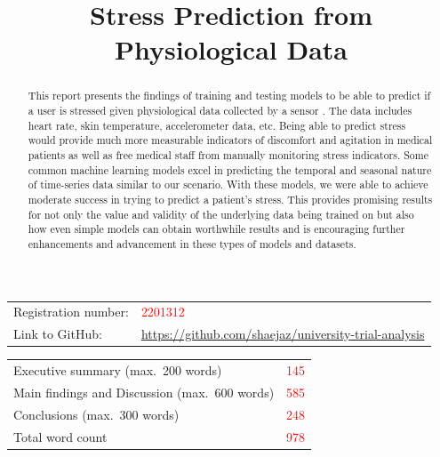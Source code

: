 \documentclass{article}
\title{Stress Prediction from Physiological Data}
\begin{document}
\maketitle

\begin{table}[h]
    \centering
    \begin{tabular}{ll}
        Registration number: & \textcolor{red}{2201312}\\
        Link to GitHub: & \url{https://github.com/shaejaz/university-trial-analysis}\\
    \end{tabular}
\end{table}


\begin{table}[h]
    \centering
    \begin{tabular}{lc}
        Executive summary (max.\ 200 words) & \textcolor{red}{145}\\
        Main findings and Discussion (max.\ 600 words) & \textcolor{red}{585}\\
        Conclusions (max.\ 300 words) & \textcolor{red}{248}\\
        \hline
        Total word count & \textcolor{red}{978}\\
    \end{tabular}
\end{table}


\tableofcontents

\clearpage


\begin{abstract}
This report presents the findings of training and testing models to be able to predict if a user is stressed given physiological data collected by a sensor \cite{iqbal22}. The data includes heart rate, skin temperature, accelerometer data, etc. Being able to predict stress would provide much more measurable indicators of discomfort and agitation in medical patients as well as free medical staff from manually monitoring stress indicators. Some common machine learning models excel in predicting the temporal and seasonal nature of time-series data similar to our scenario. With these models, we were able to achieve moderate success in trying to predict a patient's stress. This provides promising results for not only the value and validity of the underlying data being trained on but also how even simple models can obtain worthwhile results and is encouraging further enhancements and advancement in these types of models and datasets.
\end{abstract}
\end{document}
